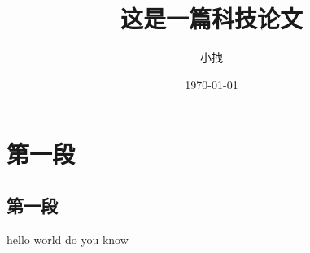 \documentclass{article}[ctex]
\title{这是一篇科技论文}
\date{\today}
\author{小拽}
\begin{document}
\maketitle
\section{第一段}
\subsection{第一段}
hello world do you know
\end{document}

